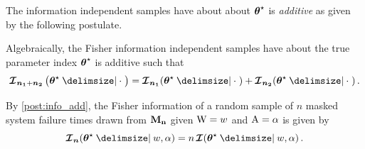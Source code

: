 \documentclass[
    11pt,
    extrafontsizes,
    article,
    oldfontcommands,
    final,
    oneside,
    openany,
    hidelinks]{memoir}
\begin{document}
The information independent samples have about about ${\boldsymbol{\mathbf{\theta}}}^{\star}$ is \emph{additive} as given by the following postulate.
\begin{postulate}
\label{post:info_add}
Algebraically, the Fisher information independent samples have about the true parameter index ${\boldsymbol{\mathbf{\theta}}}^{\star}$  is additive such that
\begin{equation}
    \infomatrx_{\matrx{n_1} + \matrx{n_2}}\left(\tparam\sysparamvec \Given 
    \cdot \; \right) = \infomatrx_{\matrx{n_1}}(\tparam\sysparamvec \Given 
    \cdot \;) + \infomatrx_{\matrx{n_2}}(\tparam\sysparamvec \Given \cdot \;)\,.
\end{equation}
\end{postulate}
By \cref{post:info_add}, the Fisher information of a random sample of $n$ masked system failure times drawn from $\boldsymbol{\mathbf{M_n}}$ given $\mathrm{W} = w$ and $\mathrm{A} = \alpha$ is given by
\begin{equation}
    \infomatrx_{\matrx{n}}(\tparam\sysparamvec \Given w, \alpha) = n \infomatrx(\tparam\sysparamvec \Given w, \alpha)\,.
\end{equation}



\end{document}
